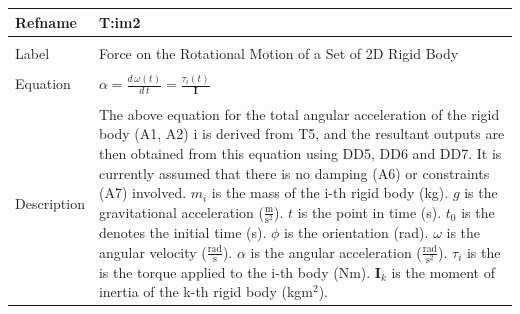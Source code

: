 \documentclass[12pt]{article}
\begin{document}
\noindent \begin{minipage}{\textwidth}
\begin{tabular}{p{} p{}}
\toprule \textbf{Refname} & \textbf{T:im2}
\label{T:im2}
\\ \midrule \\
Label & Force on the Rotational Motion of a Set of 2D Rigid Body
\\ \midrule \\
Equation & $α=\frac{d\,ω\left(t\right)}{d\,t}=\frac{{τ_{i}}\left(t\right)}{\mathbf{I}}$
\\ \midrule \\
Description & The above equation for the total angular acceleration of the rigid body (A1, A2) i is derived from T5, and the resultant outputs are then obtained from this equation using DD5, DD6 and DD7. It is currently assumed that there is no damping (A6) or constraints (A7) involved. ${m_{i}}$ is the mass of the i-th rigid body (kg). $g$ is the gravitational acceleration ($\frac{\text{m}}{\text{s}^{2}}$). $t$ is the point in time (s). ${t_{0}}$ is the denotes the initial time (s). $ϕ$ is the orientation (rad). $ω$ is the angular velocity ($\frac{\text{rad}}{\text{s}}$). $α$ is the angular acceleration ($\frac{\text{rad}}{\text{s}^{2}}$). ${τ_{i}}$ is the is the torque applied to the i-th body (Nm). ${\mathbf{I}_{k}}$ is the moment of inertia of the k-th rigid body (kg$\text{m}^{2}$).
\\ \bottomrule \end{tabular}
\end{minipage}\\
~\newline
\end{document}
